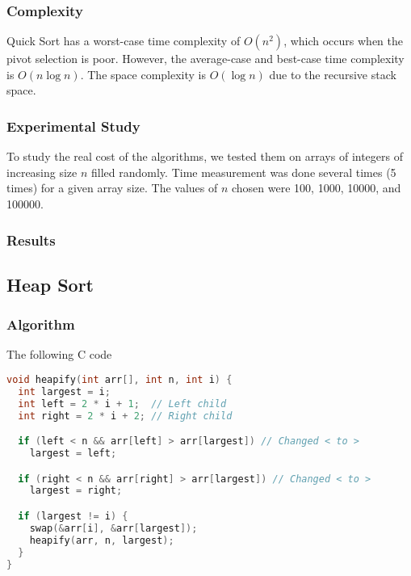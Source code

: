 \documentclass{article}
\begin{document}
\subsubsection{Complexity}
Quick Sort has a worst-case time complexity of $O(n^2)$, which occurs when the pivot selection is poor. However, the average-case and best-case time complexity is $O(n \log n)$. The space complexity is $O(\log n)$ due to the recursive stack space.

\subsubsection{Experimental Study}
To study the real cost of the algorithms, we tested them on arrays of integers of increasing size $n$ filled randomly. Time measurement was done several times (5 times) for a given array size. The values of $n$ chosen were 100, 1000, 10000, and 100000.

\subsubsection{Results}
\begin{figure}[ht]
\end{figure}


\subsection{Heap Sort}

\subsubsection{Algorithm}
The following C code

\begin{lstlisting}[language=C, caption=Matrix Multiplication]
void heapify(int arr[], int n, int i) {
  int largest = i;
  int left = 2 * i + 1;  // Left child
  int right = 2 * i + 2; // Right child

  if (left < n && arr[left] > arr[largest]) // Changed < to >
    largest = left;

  if (right < n && arr[right] > arr[largest]) // Changed < to >
    largest = right;

  if (largest != i) {
    swap(&arr[i], &arr[largest]);
    heapify(arr, n, largest);
  }
}
\end{lstlisting}
\end{document}
